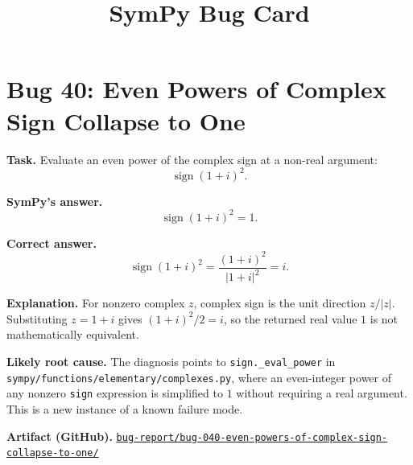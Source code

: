 \documentclass[11pt]{article}
\title{SymPy Bug Card}
\author{}
\date{}
\newcommand{\artifactrepo}{https://github.com/TODO-org/TODO-repo}
\newcommand{\bugbundle}[1]{\href{\artifactrepo/tree/main/bug-report/#1}{\nolinkurl{bug-report/#1/}}}
\begin{document}
\maketitle

\section*{Bug 40: Even Powers of Complex Sign Collapse to One}

\begin{counterexamplebox}
\textbf{Task.} Evaluate an even power of the complex sign at a non-real argument:
\[
\operatorname{sign}(1+i)^2.
\]

\medskip
\textbf{SymPy's answer.}
\[
\operatorname{sign}(1+i)^2 = 1.
\]

\medskip
\textbf{Correct answer.}
\[
\operatorname{sign}(1+i)^2
= \frac{(1+i)^2}{|1+i|^2}
= i.
\]

\medskip
\textbf{Explanation.} For nonzero complex \(z\), complex sign is the unit direction \(z/|z|\). Substituting \(z=1+i\) gives \((1+i)^2/2=i\), so the returned real value \(1\) is not mathematically equivalent.

\medskip
\textbf{Likely root cause.} The diagnosis points to \texttt{sign.\_eval\_power} in \nolinkurl{sympy/functions/elementary/complexes.py}, where an even-integer power of any nonzero \texttt{sign} expression is simplified to \(1\) without requiring a real argument. This is a new instance of a known failure mode.

\medskip
\textbf{Artifact (GitHub).} \bugbundle{bug-040-even-powers-of-complex-sign-collapse-to-one}
\end{counterexamplebox}
\end{document}
